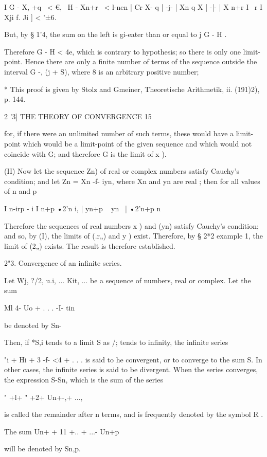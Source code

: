 I G - X, +q \ < €, \ H - Xn+r \ < l-nen | Cr X- q | -j- | Xn q X | -|-
| X n+r I ~r I Xji f. Ji ] < '±6.

But, by § 1'4, the sum on the left is gi-eater than or equal to j G -
H .

Therefore G - H < 4e, which is contrary to hypothesis; so there is
only one limit- point. Hence there are only a finite number of terms
of the sequence outside the interval G -, (j + S), where 8 is an
arbitrary positive number;

* This proof is given by Stolz and Gmeiner, Theoretische Arithmetik,
ii. (191)2), p. 144.



2 '3] THE THEORY OF CONVERGENCE 15

for, if there were an unlimited number of such terms, these would have
a limit-point which would be a limit-point of the given sequence and
which would not coincide with G; and therefore G is the limit of x ).

(II) Now let the sequence Zn) of real or complex numbers satisfy
Cauchy's condition; and let Zn = Xn -f- iyn, where Xn and yn are real
; then for all values of n and p

I n-irp - i I n+p •2'n i, | yn+p ~ yn \ | •2'n+p n\-

Therefore the sequences of real numbers x ) and (yn) satisfy Cauchy's
condition; and so, by (I), the limits of (.r„) and y ) exist.
Therefore, by § 2*2 example 1, the limit of (2„) exists. The result is
therefore established.

2"3. Convergence of an infinite series.

Let Wj, ?/2, u.i, ... Kit, ... be a sequence of numbers, real or
complex. Let the sum

Ml 4- Uo + . . . -I- tin

be denoted by Sn-

Then, if *S,i tends to a limit S as /; tends to infinity, the
infinite series

"i + Hi + 3 -f- <4 + . . . is said to he convergent, or to converge to
the sum S. In other cases, the infinite series is said to be
divergent. When the series converges, the expression S-Sn, which is
the sum of the series

" +l+ " +2+ Un+-,+ ...,

is called the remainder after n terms, and is frequently denoted by
the symbol R .

The sum Un+ + 11 +.. + ...-\- Un+p

will be denoted by Sn,p.

